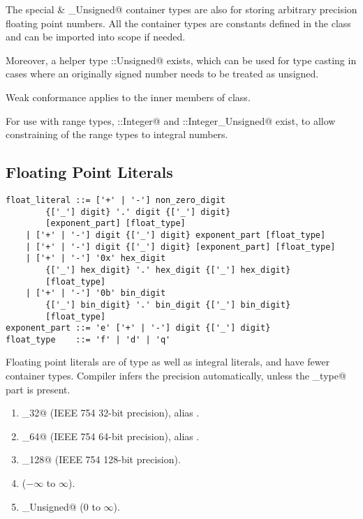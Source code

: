 The special \lstinline@Decimal@ \& \lstinline@Decimal_Unsigned@ container types are also for storing arbitrary precision floating point numbers. All the container types are constants defined in the \lstinline@Number@ class and can be imported into scope if needed. 

Moreover, a helper type \lstinline@Number::Unsigned@ exists, which can be used for type casting in cases where an originally signed number needs to be treated as unsigned. 

Weak conformance applies to the inner members of \lstinline@Number@ class. 

For use with range types, \lstinline@Number::Integer@ and \lstinline@Number::Integer_Unsigned@ exist, to allow constraining of the range types to integral numbers.

\subsection{Floating Point Literals}\label{sec:floatliterals}

\syntax\begin{lstlisting}
float_literal ::= ['+' | '-'] non_zero_digit 
		{['_'] digit} '.' digit {['_'] digit}
		[exponent_part] [float_type]
	| ['+' | '-'] digit {['_'] digit} exponent_part [float_type]
	| ['+' | '-'] digit {['_'] digit} [exponent_part] [float_type]
	| ['+' | '-'] '0x' hex_digit
		{['_'] hex_digit} '.' hex_digit {['_'] hex_digit}
		[float_type]
	| ['+' | '-'] '0b' bin_digit
		{['_'] bin_digit} '.' bin_digit {['_'] bin_digit}
		[float_type]
exponent_part ::= 'e' ['+' | '-'] digit {['_'] digit}
float_type    ::= 'f' | 'd' | 'q'
\end{lstlisting}

Floating point literals are of type \lstinline@Number@ as well as integral literals, and have fewer container types. Compiler infers the precision automatically, unless the \lstinline@float_type@ part is present. 

\begin{enumerate}

\item \lstinline@Float_32@ (IEEE 754 32-bit precision), alias \lstinline@Float@. 

\item \lstinline@Float_64@ (IEEE 754 64-bit precision), alias \lstinline@Double@.

\item \lstinline@Float_128@ (IEEE 754 128-bit precision).

\item \lstinline@Decimal@ ($-\infty$ to $\infty$).

\item \lstinline@Decimal_Unsigned@ ($0$ to $\infty$).

\end{enumerate}

